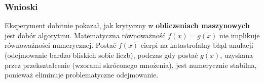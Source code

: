 \documentclass[12pt,a4paper]{article}
\begin{document}
\subsubsection{Wnioski}
Eksperyment dobitnie pokazał, jak krytyczny w \textbf{obliczeniach maszynowych} jest dobór algorytmu. Matematyczna równoważność $f(x) = g(x)$ nie implikuje równoważności numerycznej. Postać $f(x)$ cierpi na katastrofalny błąd anulacji (odejmowanie bardzo bliskich sobie liczb), podczas gdy postać $g(x)$, uzyskana przez przekształcenie (wzorami skróconego mnożenia), jest numerycznie stabilna, ponieważ eliminuje problematyczne odejmowanie.
\end{document}
